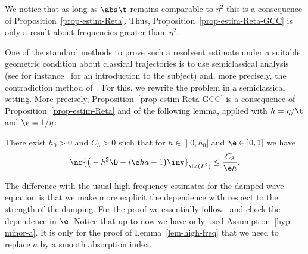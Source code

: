 We notice that as long as $\abs \t$ remains comparable to $\eta^2$ this is a consequence of Proposition~\ref{prop-estim-Reta}. Thus, Proposition~\ref{prop-estim-Reta-GCC} is only a result about frequencies greater than~$\eta^2$.

One of the standard methods to prove such a resolvent estimate under a suitable geometric condition about classical trajectories is to use semiclassical analysis (see for instance~\cite{zworski} for an introduction to the subject) and, more precisely, the contradiction method of~\cite{Lebeau96}. For this, we rewrite the problem in a semiclassical setting. More precisely, Proposition~\ref{prop-estim-Reta-GCC} is a consequence of Proposition~\ref{prop-estim-Reta} and of the following lemma, applied with $h = \eta / \t$ and $\e = 1/\eta$:

\begin{lemm}\label{lem-high-freq}
There exist $h_0 > 0$ and $C_3 > 0$ such that for $h \in\mathopen{]}0,h_0]$ and $\e \in\mathopen{]}0,1]$ we have
\[
\nr{\big(-h^2 \D - i \e h a - 1 \big) \inv}_{\Lc(L^2)} \leq \frac {C_3} {\e h}.
\]
\end{lemm}

The difference with the usual high frequency estimates for the damped wave equation is that we make more explicit the dependence with respect to the strength of the damping. For the proof we essentially follow~\cite{BurqJo} and check the dependence in $\e$. Notice that up to now we have only used Assumption~\eqref{hyp-minor-a}. It is only for the proof of Lemma~\ref{lem-high-freq} that we need to replace $a$ by a smooth absorption index.

